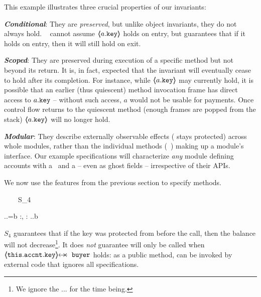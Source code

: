  
\noindent
This example illustrates three crucial properties of our invariants:
 \begin{customquote}
 \vspace{.05cm}
\noindent
\textbf{\emph{Conditional}}: They %
are \emph{preserved}, but unlike object invariants, they do not %
always hold.
\ \Eg   {} cannot assume $\langle\!\!\langle a.\mbox{\normalfont{\texttt{key}}} \rangle\!\!\rangle$ holds on entry, but   guarantees that if it holds on entry, then  it will still hold on exit.

\vspace{.05cm}
\noindent
\textbf{\emph{Scoped}}:  %
They %
 are preserved during  execution of a specific method but not beyond its return. It is, in fact, expected that the invariant will eventually cease to hold after its completion. For instance, while $\langle\!\!\langle a.\mbox{\normalfont{\texttt{key}}} \rangle\!\!\rangle$ may currently hold, it is possible that an earlier (thus quiescent) method invocation frame has direct access to $a.\mbox{\normalfont{\texttt{key}}}$ -- without such access, $a$ would not be usable for payments. Once control flow returns to the quiescent method (\ie enough frames are popped from the stack) $\langle\!\!\langle a.\mbox{\normalfont{\texttt{key}}} \rangle\!\!\rangle$  will no longer hold.

 \vspace{.05cm}
\noindent
\textbf{\emph{Modular}}: They %
describe  externally observable effects (\eg  {} stays protected) across whole modules,
rather than  the individual methods (\eg\, ) making up a module's interface.
Our example specifications will
characterize \emph{any}
module defining accounts with a  %
 \balance~and a \prg{\password} -- even as ghost fields --  irrespective of their APIs. %
 \end{customquote}
 
 \begin{example}
 We   now use the features from the previous section to specify methods. 

{\sprepostShort
		{\strut \ \ \ \ S_4} 
		{    {} \wedge {}.\prg{\myAccount}.\prg{\balance}=b
		 }
		{} {} {:, : }
		{ 
		  .\prg{\myAccount}.\prg{\balance}\geq b
		} 
		}

\noindent
$S_4$  guarantees that if the  key was protected from  before the call, then the balance will not decrease\footnote{We ignore the ... for the time being.}.
 It does \emph{not} guarantee  will only be called when $\protectedFrom{\prg{this}.\prg{\myAccount}.\prg{key}} {\prg{buyer}}$ holds: 
as a  public method,    can be invoked by external code that ignores all specifications.
\end{example}

